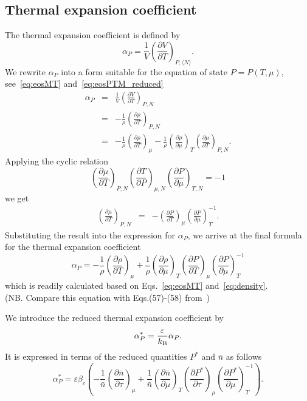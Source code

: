 \documentclass[12pt]{article}
\begin{document}
	\subsection{Thermal expansion coefficient}
	The thermal expansion coefficient is defined by
	\begin{equation}
		\alpha_P = \frac{1}{V}\left(\frac{\partial V}{\partial T}\right)_{P,\langle N\rangle}.
	\end{equation}
	We rewrite $\alpha_P$ into a form suitable for the equation of state $P=P(T,\mu)$, see~\eqref{eq:eosMT} and~\eqref{eq:eosPTM_reduced}
	\begin{eqnarray}
		\alpha_P & = & \frac{1}{V}\left(\frac{\partial V}{\partial T}\right)_{P, N}
		\nonumber\\
		\label{eq:alpha_vs_rho}
		& = & -\frac{1}{\rho} \left(\frac{\partial \rho}{\partial T}\right)_{P, N}
		\\
		& = & -\frac{1}{\rho} \left(\frac{\partial \rho}{\partial T}\right)_{\mu} 
		 - \frac{1}{\rho} \left(\frac{\partial \rho}{\partial \mu}\right)_{T}
		 \left(\frac{\partial \mu}{\partial T}\right)_{P, N}.
	\end{eqnarray}
	Applying the cyclic relation
	\begin{equation*}
		\left(\frac{\partial \mu}{\partial T}\right)_{P, N}
		\left(\frac{\partial T}{\partial P}\right)_{\mu, N}
		\left(\frac{\partial P}{\partial \mu}\right)_{T, N}
		= -1
	\end{equation*}
	we get
	\begin{eqnarray*}
		\left(\frac{\partial \mu}{\partial T}\right)_{P, N} & = & 
		- \left(\frac{\partial P}{\partial T}\right)_{\mu}
		\left(\frac{\partial P}{\partial \mu}\right)^{-1}_{T}.
	\end{eqnarray*}
	Substituting the result into the expression for $\alpha_P$, we arrive at the final formula for the thermal expansion coefficient
	\begin{equation}
		\alpha_P = -\frac{1}{\rho}\left(\frac{\partial \rho}{\partial T}\right)_{\mu}
		+ \frac{1}{\rho} \left(\frac{\partial \rho}{\partial \mu}\right)_{T}
		\left(\frac{\partial P}{\partial T}\right)_{\mu}
		\left(\frac{\partial P}{\partial \mu}\right)^{-1}_{T}
	\end{equation}
	which is readily calculated based on Eqs.~\eqref{eq:eosMT} and~\eqref{eq:density}.\\
	(NB. Compare this equation with Eqs.(57)-(58) from~\cite{StrokerMeier2021})
	
	We introduce the reduced thermal expansion coefficient by
	\begin{equation}
		\alpha^*_P = \frac{\varepsilon}{k_{\rm B}} \alpha_P.
	\end{equation}
	It is expressed in terms of the reduced quantities $P^*$ and $\bar{n}$ as follows
	\begin{equation}
		\alpha^*_P = \varepsilon \beta_c 
		\left( 
		-\frac{1}{\bar{n}}\left(\frac{\partial \bar{n}}{\partial \tau}\right)_{\mu}
		+ \frac{1}{\bar{n}} \left(\frac{\partial \bar{n}}{\partial \mu}\right)_{T}
		\left(\frac{\partial P^*}{\partial \tau}\right)_{\mu}
		\left(\frac{\partial P^*}{\partial \mu}\right)^{-1}_{T} 
		\right).
	\end{equation}
	
\end{document}
